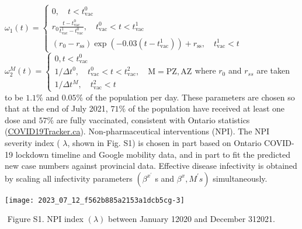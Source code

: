 \documentclass[10pt]{article}
\begin{document}
​
$\omega_{1}(t)=\left\{\begin{array}{c}0, \quad t<t_{\mathrm{vac}}^{0} \\ r_{0} \frac{t-t_{\mathrm{vac}}^{0}}{t_{\mathrm{vac}}^{1}-t_{\mathrm{vac}}^{0}}, \quad t_{\mathrm{vac}}^{0}<t<t_{\mathrm{vac}}^{1} \\ \left(r_{0}-r_{\mathrm{ss}}\right) \exp \left(-0.03\left(t-t_{\mathrm{vac}}^{1}\right)\right)+r_{\mathrm{ss}}, \quad t_{\mathrm{vac}}^{1}<t\end{array}\right.$ $\omega_{2}^{M}(t)=\left\{\begin{array}{c}0, t<t_{\mathrm{vac}}^{0} \\ 1 / \Delta t^{0}, \quad t_{\mathrm{vac}}^{0}<t<t_{\mathrm{vac}}^{2}, \quad \mathrm{M}=\mathrm{PZ}, \mathrm{AZ} \\ 1 / \Delta t^{M}, \quad t_{\mathrm{vac}}^{2}<t\end{array}\right.$
​
where $r_{0}$ and $r_{s s}$ are taken to be $1.1 \%$ and $0.05 \%$ of the population per day. These parameters are chosen so that at the end of July 2021, $71 \%$ of the population have received at least one dose and $57 \%$ are fully vaccinated, consistent with Ontario statistics (\href{http://COVID19Tracker.ca}{COVID19Tracker.ca}).
​
Non-pharmaceutical interventions (NPI). The NPI severity index ( $\lambda$, shown in Fig. S1) is chosen in part based on Ontario COVID-19 lockdown timeline and Google mobility data, and in part to fit the predicted new case numbers against provincial data. Effective disease infectivity is obtained by scaling all infectivity parameters $\left(\beta^{x^{\prime}}\right.$ s and $\left.\beta^{x}, M^{\prime} s\right)$ simultaneously.
​
\begin{center}
\texttt{[image: 2023\_07\_12\_f562b885a2153a1dcb5cg-3]}
\end{center}
​
Figure S1. NPI index $(\lambda)$ between January 12020 and December 312021.
​
\end{document}
